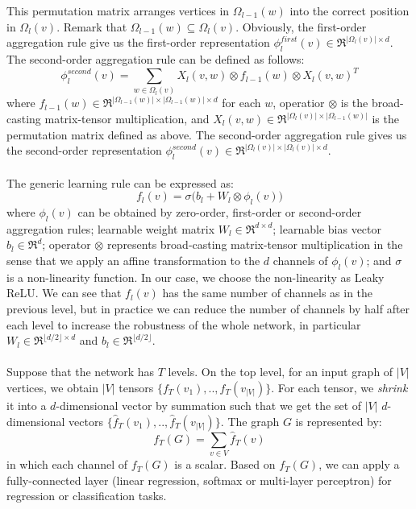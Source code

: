 \documentclass[a4paper]{article}
\begin{document}
This permutation matrix arranges vertices in $\Omega_{l - 1}(w)$ into the correct position in $\Omega_l(v)$. Remark that $\Omega_{l - 1}(w) \subseteq \Omega_l(v)$. Obviously, the first-order aggregation rule give us the first-order representation $\phi_l^{first}(v) \in \Re^{|\Omega_l(v)| \times d}$. The second-order aggregation rule can be defined as follows:
$$\phi_l^{second}(v) = \sum\limits_{w \in \Omega_l(v)} X_l(v, w) \otimes f_{l - 1}(w) \otimes X_l(v, w)^T$$
where $f_{l - 1}(w) \in \Re^{|\Omega_{l - 1}(w)| \times |\Omega_{l - 1}(w)| \times d}$ for each $w$, operatior $\otimes$ is the broad-casting matrix-tensor multiplication, and $X_l(v, w) \in \Re^{|\Omega_l(v)| \times |\Omega_{l - 1}(w)|}$ is the permutation matrix defined as above. The second-order aggregation rule gives us the second-order representation $\phi_l^{second}(v) \in \Re^{|\Omega_l(v)| \times |\Omega_l(v)| \times d}$. \\ \\
The generic learning rule can be expressed as:
$$f_l(v) = \sigma \big( b_l + W_l \otimes \phi_l(v) \big)$$
where $\phi_l(v)$ can be obtained by zero-order, first-order or second-order aggregation rules; learnable weight matrix $W_l \in \Re^{d \times d}$; learnable bias vector $b_l \in \Re^d$; operator $\otimes$ represents broad-casting matrix-tensor multiplication in the sense that we apply an affine transformation to the $d$ channels of $\phi_l(v)$; and $\sigma$ is a non-linearity function. In our case, we choose the non-linearity as Leaky ReLU. We can see that $f_l(v)$ has the same number of channels as in the previous level, but in practice we can reduce the number of channels by half after each level to increase the robustness of the whole network, in particular $W_l \in \Re^{\lfloor d/2 \rfloor \times d}$ and $b_l \in \Re^{\lfloor d / 2 \rfloor}$. \\ \\
Suppose that the network has $T$ levels. On the top level, for an input graph of $|V|$ vertices, we obtain $|V|$ tensors $\{f_T(v_1), .., f_T(v_{|V|})\}$. For each tensor, we \textit{shrink} it into a $d$-dimensional vector by summation such that we get the set of $|V|$ $d$-dimensional vectors $\{\hat{f}_T(v_1), .., \hat{f}_T(v_{|V|})\}$. The graph $G$ is represented by:
$$f_T(G) = \sum\limits_{v \in V} \hat{f}_T(v)$$
in which each channel of $f_T(G)$ is a scalar. Based on $f_T(G)$, we can apply a fully-connected layer (linear regression, softmax or multi-layer perceptron) for regression or classification tasks. 
\end{document}
